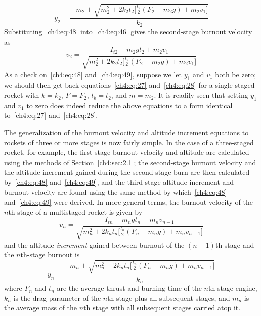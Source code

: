 \begin{equation}\label{ch4:eq:48}
y_2 = \frac{-m_2 + \sqrt{m_2^{2} + 2k_2t_2\bigl[\tfrac{t_2}{2}(F_2 - m_2g) + m_2v_1\bigr]}}{k_2}
\end{equation}
Substituting~\eqref{ch4:eq:48} into~\eqref{ch4:eq:46} gives the second-stage burnout velocity as
\begin{equation}\label{ch4:eq:49}
v_2 = \frac{I_{t2} - m_2gt_2 + m_2v_1}{\sqrt{m_2^{2} + 2k_2t_2\bigl[\tfrac{t_2}{2}(F_2 - m_2g)
  + m_2v_1\bigr]}}
\end{equation}
As a check on~\eqref{ch4:eq:48} and~\eqref{ch4:eq:49}, suppose we let $y_1$ and $v_1$ both be zero;
we should then get back equations~\eqref{ch4:eq:27} and~\eqref{ch4:eq:28} for a single-staged
rocket with $k = k_2$, $F = F_2$, $t_b = t_2$, and $m = m_2$. It is readily seen that setting $y_1$
and $v_1$ to zero does indeed reduce the above equations to a form identical to~\eqref{ch4:eq:27}
and~\eqref{ch4:eq:28}.

The generalization of the burnout velocity and altitude increment equations to rockets of three or
more stages is now fairly simple. In the case of a three-staged rocket, for example, the
first-stage burnout velocity and altitude are calculated using the methods of
Section~\ref{ch4:sec:2.1}; the second-stage burnout velocity and the altitude increment gained
during the second-stage burn are then calculated by~\eqref{ch4:eq:48} and~\eqref{ch4:eq:49}, and the
third-stage altitude increment and burnout velocity are found using the same method by
which~\eqref{ch4:eq:48} and~\eqref{ch4:eq:49} were derived. In more general terms, the burnout
velocity of the $n$th stage of a multistaged rocket is given by
\begin{equation}\label{ch4:eq:50}
v_n = \frac{I_{tn} - m_ngt_n + m_nv_{n-1}}{\sqrt{m_n^{2} + 2k_nt_n\bigl[\tfrac{t_n}{2}(F_n - m_ng)
  + m_nv_{n-1}\bigr]}}
\end{equation}
and the altitude \emph{increment} gained between burnout of the $(n-1)$th stage and the $n$th-stage
burnout is
\begin{equation}\label{ch4:eq:51}
y_n = \frac{-m_n + \sqrt{m_n^{2} + 2k_nt_n\bigl[\tfrac{t_n}{2}(F_n - m_ng) + m_nv_{n-1}\bigr]}}{k_n}
\end{equation}
where $F_n$ and $t_n$ are the average thrust and burning time of the $n$th-stage engine, $k_n$ is
the drag parameter of the $n$th stage plus all subsequent stages, and $m_n$ is the average mass of
the $n$th stage with all subsequent stages carried atop it.

